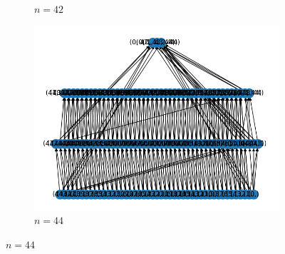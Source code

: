 \begin{figure}[h]
\begin{subfigure}{.5\textwidth}
        \caption{$ n = 42 $}
      \end{subfigure}%
      \begin{subfigure}{.5\textwidth}
        \centering
        \includegraphics[width=.8\linewidth]{44.png}
        \caption{$ n = 44 $}
      \end{subfigure}
\end{figure}
